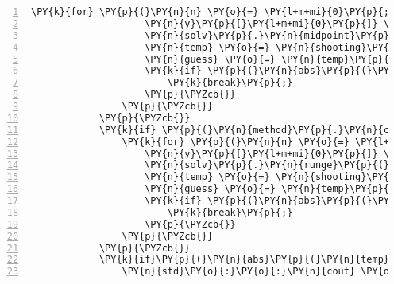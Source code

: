 \begin{Verbatim}[tabsize=2,commandchars=\\\{\},numbers=left,firstnumber=1,stepnumber=1]
				\PY{k}{for} \PY{p}{(}\PY{n}{n} \PY{o}{=} \PY{l+m+mi}{0}\PY{p}{;} \PY{n}{n} \PY{o}{\PYZlt{}} \PY{l+m+mi}{500}\PY{p}{;} \PY{n}{n}\PY{o}{+}\PY{o}{+}\PY{p}{)}\PY{p}{\PYZob{}}
					\PY{n}{y}\PY{p}{[}\PY{l+m+mi}{0}\PY{p}{]} \PY{o}{=} \PY{l+m+mf}{0.}\PY{p}{;} \PY{n}{y}\PY{p}{[}\PY{l+m+mi}{1}\PY{p}{]} \PY{o}{=} \PY{n}{guess}\PY{p}{;} \PY{n}{y}\PY{p}{[}\PY{l+m+mi}{2}\PY{p}{]} \PY{o}{=} \PY{l+m+mf}{0.}\PY{p}{;} \PY{n}{y}\PY{p}{[}\PY{l+m+mi}{3}\PY{p}{]} \PY{o}{=} \PY{l+m+mf}{1.}\PY{p}{;}
					\PY{n}{solv}\PY{p}{.}\PY{n}{midpoint}\PY{p}{(}\PY{n}{y}\PY{p}{,} \PY{n}{f}\PY{p}{,} \PY{n}{j}\PY{p}{)}\PY{p}{;}
					\PY{n}{temp} \PY{o}{=} \PY{n}{shooting}\PY{p}{(}\PY{n}{guess}\PY{p}{,} \PY{n}{y}\PY{p}{,} \PY{n}{d}\PY{p}{)}\PY{p}{;}
					\PY{n}{guess} \PY{o}{=} \PY{n}{temp}\PY{p}{[}\PY{l+m+mi}{0}\PY{p}{]}\PY{p}{;}
					\PY{k}{if} \PY{p}{(}\PY{n}{abs}\PY{p}{(}\PY{n}{temp}\PY{p}{[}\PY{l+m+mi}{1}\PY{p}{]}\PY{p}{)}\PY{o}{\PYZlt{}}\PY{n}{tol}\PY{p}{)}\PY{p}{\PYZob{}}
						\PY{k}{break}\PY{p}{;}
					\PY{p}{\PYZcb{}}
				\PY{p}{\PYZcb{}}
			\PY{p}{\PYZcb{}}
			\PY{k}{if} \PY{p}{(}\PY{n}{method}\PY{p}{.}\PY{n}{compare}\PY{p}{(}\PY{l+s}{\PYZdq{}}\PY{l+s}{runge\PYZhy{}kutta}\PY{l+s}{\PYZdq{}}\PY{p}{)} \PY{o}{=}\PY{o}{=} \PY{l+m+mi}{0}\PY{p}{)}\PY{p}{\PYZob{}}
				\PY{k}{for} \PY{p}{(}\PY{n}{n} \PY{o}{=} \PY{l+m+mi}{0}\PY{p}{;} \PY{n}{n} \PY{o}{\PYZlt{}} \PY{l+m+mi}{500}\PY{p}{;} \PY{n}{n}\PY{o}{+}\PY{o}{+}\PY{p}{)}\PY{p}{\PYZob{}}
					\PY{n}{y}\PY{p}{[}\PY{l+m+mi}{0}\PY{p}{]} \PY{o}{=} \PY{l+m+mf}{0.}\PY{p}{;} \PY{n}{y}\PY{p}{[}\PY{l+m+mi}{1}\PY{p}{]} \PY{o}{=} \PY{n}{guess}\PY{p}{;} \PY{n}{y}\PY{p}{[}\PY{l+m+mi}{2}\PY{p}{]} \PY{o}{=} \PY{l+m+mf}{0.}\PY{p}{;} \PY{n}{y}\PY{p}{[}\PY{l+m+mi}{3}\PY{p}{]} \PY{o}{=} \PY{l+m+mf}{1.}\PY{p}{;}
					\PY{n}{solv}\PY{p}{.}\PY{n}{runge}\PY{p}{(}\PY{n}{y}\PY{p}{,} \PY{n}{f}\PY{p}{,} \PY{n}{j}\PY{p}{)}\PY{p}{;}
					\PY{n}{temp} \PY{o}{=} \PY{n}{shooting}\PY{p}{(}\PY{n}{guess}\PY{p}{,} \PY{n}{y}\PY{p}{,} \PY{n}{d}\PY{p}{)}\PY{p}{;}
					\PY{n}{guess} \PY{o}{=} \PY{n}{temp}\PY{p}{[}\PY{l+m+mi}{0}\PY{p}{]}\PY{p}{;}
					\PY{k}{if} \PY{p}{(}\PY{n}{abs}\PY{p}{(}\PY{n}{temp}\PY{p}{[}\PY{l+m+mi}{1}\PY{p}{]}\PY{p}{)}\PY{o}{\PYZlt{}}\PY{n}{tol}\PY{p}{)}\PY{p}{\PYZob{}}
						\PY{k}{break}\PY{p}{;}
					\PY{p}{\PYZcb{}}
				\PY{p}{\PYZcb{}}
			\PY{p}{\PYZcb{}}
			\PY{k}{if}\PY{p}{(}\PY{n}{abs}\PY{p}{(}\PY{n}{temp}\PY{p}{[}\PY{l+m+mi}{1}\PY{p}{]}\PY{p}{)}\PY{o}{\PYZgt{}}\PY{l+m+mf}{1.}\PY{p}{)}\PY{p}{\PYZob{}} \PY{c+c1}{// deal with being unable to find the root}
				\PY{n}{std}\PY{o}{:}\PY{o}{:}\PY{n}{cout} \PY{o}{\PYZlt{}}\PY{o}{\PYZlt{}} \PY{l+s}{\PYZdq{}}\PY{l+s}{A root was not found during the shooting method. Something is probably wrong.}\PY{l+s}{\PYZdq{}} \PY{o}{\PYZlt{}}\PY{o}{\PYZlt{}} \PY{n}{std}\PY{o}{:}\PY{o}{:}\PY{n}{endl}\PY{p}{;}

\end{Verbatim}
